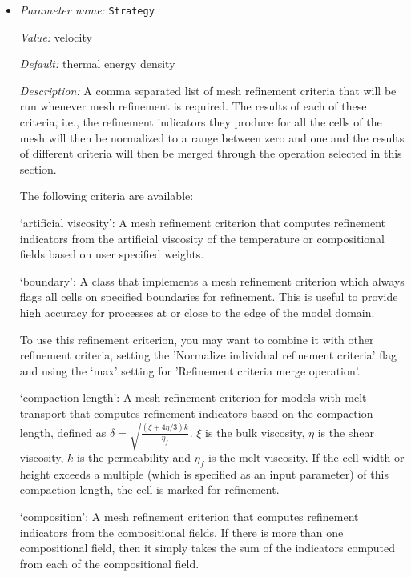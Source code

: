 \begin{itemize}
{\it Description:} Whether or not solvers should be executed during the initial adaptive refinement cycles that are run at the start of the simulation.


{\it Possible values:} A boolean value (true or false)
\item {\it Parameter name:} {\tt Strategy}
\label{parameters:Mesh refinement/Strategy}
\label{parameters:Mesh_20refinement/Strategy}


{\it Value:} velocity


{\it Default:} thermal energy density


{\it Description:} A comma separated list of mesh refinement criteria that will be run whenever mesh refinement is required. The results of each of these criteria, i.e., the refinement indicators they produce for all the cells of the mesh will then be normalized to a range between zero and one and the results of different criteria will then be merged through the operation selected in this section.

The following criteria are available:

`artificial viscosity': A mesh refinement criterion that computes refinement indicators from the artificial viscosity of the temperature or compositional fields based on user specified weights.

`boundary': A class that implements a mesh refinement criterion which always flags all cells on specified boundaries for refinement. This is useful to provide high accuracy for processes at or close to the edge of the model domain.

To use this refinement criterion, you may want to combine it with other refinement criteria, setting the 'Normalize individual refinement criteria' flag and using the `max' setting for 'Refinement criteria merge operation'.

`compaction length': A mesh refinement criterion for models with melt transport that computes refinement indicators based on the compaction length, defined as $\delta = \sqrt{\frac{(\xi + 4 \eta/3) k}{\eta_f}}$. $\xi$ is the bulk viscosity, $\eta$ is the shear viscosity, $k$ is the permeability and $\eta_f$ is the melt viscosity. If the cell width or height exceeds a multiple (which is specified as an input parameter) of this compaction length, the cell is marked for refinement.

`composition': A mesh refinement criterion that computes refinement indicators from the compositional fields. If there is more than one compositional field, then it simply takes the sum of the indicators computed from each of the compositional field.


\end{itemize}

